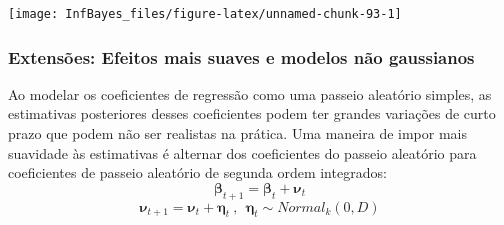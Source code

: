 \documentclass[
]{book}
\newenvironment{Shaded}{\begin{snugshade}}{\end{snugshade}}
\newcommand{\DataTypeTok}[1]{\textcolor[rgb]{0.13,0.29,0.53}{#1}}
\newcommand{\DecValTok}[1]{\textcolor[rgb]{0.00,0.00,0.81}{#1}}
\newcommand{\KeywordTok}[1]{\textcolor[rgb]{0.13,0.29,0.53}{\textbf{#1}}}
\newcommand{\NormalTok}[1]{#1}
\newcommand{\OperatorTok}[1]{\textcolor[rgb]{0.81,0.36,0.00}{\textbf{#1}}}
\newcommand{\StringTok}[1]{\textcolor[rgb]{0.31,0.60,0.02}{#1}}
\begin{document}
\begin{center}\texttt{[image: InfBayes\_files/figure-latex/unnamed-chunk-93-1]} \end{center}

\hypertarget{extensuxf5es-efeitos-mais-suaves-e-modelos-nuxe3o-gaussianos}{%
\subsubsection{Extensões: Efeitos mais suaves e modelos não gaussianos}\label{extensuxf5es-efeitos-mais-suaves-e-modelos-nuxe3o-gaussianos}}

Ao modelar os coeficientes de regressão como uma passeio aleatório simples, as estimativas posteriores desses coeficientes podem ter grandes variações de curto prazo que podem não ser realistas na prática. Uma maneira de impor mais suavidade às estimativas é alternar dos coeficientes do passeio aleatório para coeficientes de passeio aleatório de segunda ordem integrados:
\[\boldsymbol\beta_{t+1} = \boldsymbol\beta_t + \boldsymbol\nu_t\]
\[\boldsymbol\nu_{t+1} = \boldsymbol\nu_t + \boldsymbol\eta_t ~,~~ \boldsymbol\eta_t \sim \textit{Normal}_k(0,D)\]

\begin{Shaded}
\end{Shaded}
\end{document}
